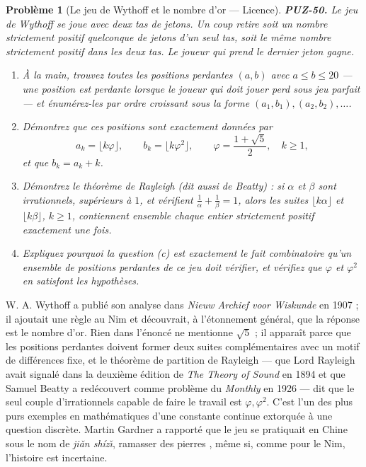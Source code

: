 \documentclass[11pt]{article}
\newtheorem{problem}{Problème}
\begin{document}
\begin{problem}[{Le jeu de Wythoff et le nombre d'or --- Licence}]
\textbf{PUZ-50.} Le jeu de Wythoff se joue avec deux tas de jetons. Un coup retire soit un
nombre strictement positif quelconque de jetons d'un seul tas, soit le \textit{même} nombre
strictement positif dans les deux tas. Le joueur qui prend le dernier jeton gagne.
\begin{enumerate}
\item[(a)] À la main, trouvez toutes les positions perdantes $ (a, b) $ avec
$ a \le b \le 20 $ --- une position est perdante lorsque le joueur qui doit jouer perd sous
jeu parfait --- et énumérez-les par ordre croissant sous la forme
$ (a_1, b_1), (a_2, b_2), \dots $.
\item[(b)] Démontrez que ces positions sont exactement données par
\[ a_k = \lfloor k\varphi \rfloor, \qquad b_k = \lfloor k\varphi^2 \rfloor,
 \qquad \varphi = \frac{1+\sqrt{5}}{2}, \quad k \ge 1, \]
et que $ b_k = a_k + k $.
\item[(c)] Démontrez le théorème de Rayleigh (dit aussi de Beatty) : si $ \alpha $ et
$ \beta $ sont irrationnels, supérieurs à $ 1 $, et vérifient
$ \frac{1}{\alpha} + \frac{1}{\beta} = 1 $, alors les suites
$ \lfloor k\alpha \rfloor $ et $ \lfloor k\beta \rfloor $, $ k \ge 1 $, contiennent
ensemble chaque entier strictement positif exactement une fois.
\item[(d)] Expliquez pourquoi la question (c) est exactement le fait combinatoire qu'un ensemble de
positions perdantes de ce jeu doit vérifier, et vérifiez que $ \varphi $ et
$ \varphi^2 $ en satisfont les hypothèses.
\end{enumerate}

\end{problem}

\noindent W. A. Wythoff a publié son analyse dans \textit{Nieuw Archief voor Wiskunde}
en 1907 ; il ajoutait une règle au Nim et découvrait, à l'étonnement général, que la réponse
est le nombre d'or. Rien dans l'énoncé ne mentionne $ \sqrt{5} $ ; il apparaît parce que
les positions perdantes doivent former deux suites complémentaires avec un motif de
différences fixe, et le théorème de partition de Rayleigh --- que Lord Rayleigh avait signalé
dans la deuxième édition de \textit{The Theory of Sound} en 1894 et que Samuel Beatty a
redécouvert comme problème du \textit{Monthly} en 1926 --- dit que le seul couple d'irrationnels
capable de faire le travail est $ \varphi, \varphi^2 $. C'est l'un des plus purs exemples
en mathématiques d'une constante continue extorquée à une question discrète. Martin Gardner
a rapporté que le jeu se pratiquait en Chine sous le nom de \textit{ji\v{a}n shíz\v{\i}}, \og{} ramasser des
pierres \fg{}, même si, comme pour le Nim, l'histoire est incertaine.
\end{document}
